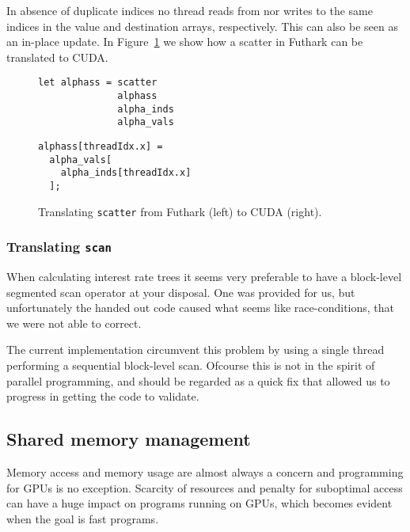 In absence of duplicate indices no thread reads from nor
writes to the same indices in the value and destination
arrays, respectively. This can also be seen as an in-place
update. In Figure~\ref{fig:trans_scatter} we show how a
scatter in Futhark can be translated to CUDA.
%
\begin{figure}[bt]
\begin{center}
\begin{minipage}[t]{0.45\linewidth}
\vspace{0pt}
\begin{lstlisting}
let alphass = scatter
              alphass
              alpha_inds
              alpha_vals
\end{lstlisting}
\end{minipage}
\begin{minipage}[t]{0.45\linewidth}
\vspace{0pt}
\begin{lstlisting}
alphass[threadIdx.x] =
  alpha_vals[
    alpha_inds[threadIdx.x]
  ];
\end{lstlisting}
\end{minipage}
\caption{Translating \texttt{scatter} from Futhark (left) to
  CUDA (right).}
\label{fig:trans_scatter}
\end{center}
\end{figure}


\subsubsection{Translating \texttt{scan}}

When calculating interest rate trees it seems very preferable to
have a block-level segmented scan operator at your disposal.
One was provided for us, but unfortunately the handed out code caused what
seems like race-conditions, that we were not able to correct.

The current implementation circumvent this problem by using
a single thread performing a sequential block-level scan.
Ofcourse this is not in the spirit of parallel programming,
and should be regarded as a quick fix that allowed us to progress
in getting the code to validate.


\subsection{Shared memory management}

Memory access and memory usage are almost always a concern and
programming for GPUs is no exception. Scarcity of resources
and penalty for suboptimal access can have a huge impact on
programs running on GPUs, which becomes evident when the
goal is fast programs.


